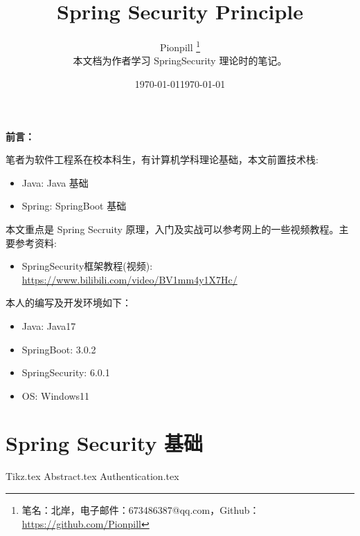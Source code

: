 \documentclass{PionpillNote-book}
\title{Spring Security Principle}
\author{
    Pionpill \footnote{笔名：北岸，电子邮件：673486387@qq.com，Github：\url{https://github.com/Pionpill}} \\
    本文档为作者学习 SpringSecurity 理论时的笔记。\\
}
\date{\today}
\begin{document}
\pagestyle{plain}
\maketitle

\noindent\textbf{前言：}

笔者为软件工程系在校本科生，有计算机学科理论基础，本文前置技术栈:
\begin{itemize}
    \item Java: Java 基础
    \item Spring: SpringBoot 基础
\end{itemize}

本文重点是 Spring Secruity 原理，入门及实战可以参考网上的一些视频教程。主要参考资料:
\begin{itemize}
    \item SpringSecurity框架教程(视频): \url{https://www.bilibili.com/video/BV1mm4y1X7Hc/}
\end{itemize}

本人的编写及开发环境如下：
\begin{itemize}
    \item Java: Java17
    \item SpringBoot: 3.0.2
    \item SpringSecurity: 6.0.1
    \item OS: Windows11
\end{itemize}

\date{\today}
\newpage

\tableofcontents

\newpage

\setcounter{page}{1} 
\pagestyle{fancy}

\chapter{Spring Security 基础}
{Tikz.tex}
{Abstract.tex}
{Authentication.tex}
\end{document}
